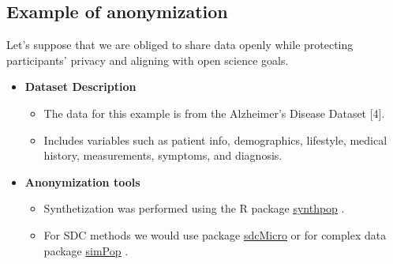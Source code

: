 \documentclass[a0,portrait]{a0poster}
\begin{document}
\begin{multicols}{3}

\section{Example of anonymization}

Let's suppose that we are obliged to share data openly while protecting participants' privacy and aligning with open science goals.

\begin{itemize}
    \item[\ding{228}] \textbf{Dataset Description}
        \begin{itemize}   
            \item[\textbullet] The data for this example is from the Alzheimer’s Disease Dataset [4].
            \item[\textbullet] Includes variables such as patient info, demographics, lifestyle, medical history, measurements, symptoms, and diagnosis.  
        \end{itemize}
    \item[\ding{228}] \textbf{Anonymization tools}
        \begin{itemize}   
            \item[\textbullet] Synthetization was performed using the R package  \href{https://cran.r-project.org/web/packages/synthpop/index.html}{\color{blue}\underline{synthpop}} \cite{2022_Synthpop}.
            \item[\textbullet]  For SDC methods we would use package \href{https://cran.r-project.org/web/packages/sdcMicro/index.html}{\color{blue}\underline{sdcMicro}} \cite{2024_Sdcmicro} or for complex data package \href{https://cran.r-project.org/web/packages/simPop/index.html}{\color{blue}\underline{simPop}} \cite{2022_Simpop}.
        \end{itemize}
\end{itemize}


\end{multicols}
\end{document}
